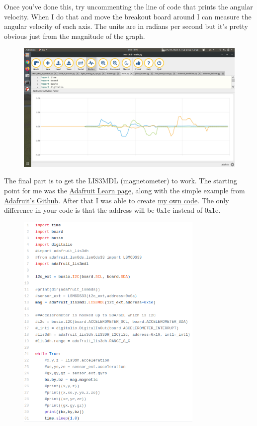 Once you’ve done this, try uncommenting the line of code that prints the angular velocity. When I do that and move the breakout board around I can measure the angular velocity of each axis. The units are in radians per second but it’s pretty obvious just from the magnitude of the graph.
\begin{figure}[H]
  \begin{center}
    \includegraphics[width=\textwidth]{Figures/imu_mag.png}
  \end{center}
\end{figure}
The final part is to get the LIS3MDL (magnetometer) to work. The starting point for me was the \href{https://learn.adafruit.com/lis3mdl-triple-axis-magnetometer/python-circuitpython}{Adafruit Learn page}, along with the simple example from \href{https://github.com/adafruit/Adafruit_CircuitPython_LIS3MDL/blob/master/examples/lis3mdl_simpletest.py}{Adafruit's Github}. After that I was able to create \href{https://github.com/cmontalvo251/Microcontrollers/blob/master/Circuit_Playground/CircuitPython/Accelerometer/external_lis3mdl.py}{my own code}. The only difference in your code is that the address will be 0x1c instead of 0x1e.
\begin{figure}[H]
  \begin{center}
    \includegraphics[width=0.8\textwidth]{Figures/imu_code_mag.png}
  \end{center}
\end{figure}
